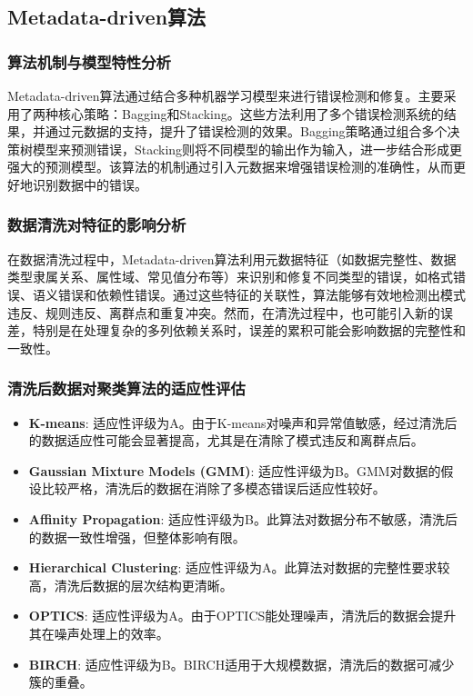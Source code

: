 \documentclass{ctexart} %
\begin{document}
\subsection{Metadata-driven算法}

\subsubsection{算法机制与模型特性分析}

Metadata-driven算法通过结合多种机器学习模型来进行错误检测和修复。主要采用了两种核心策略：Bagging和Stacking。这些方法利用了多个错误检测系统的结果，并通过元数据的支持，提升了错误检测的效果。Bagging策略通过组合多个决策树模型来预测错误，Stacking则将不同模型的输出作为输入，进一步结合形成更强大的预测模型。该算法的机制通过引入元数据来增强错误检测的准确性，从而更好地识别数据中的错误。

\subsubsection{数据清洗对特征的影响分析}

在数据清洗过程中，Metadata-driven算法利用元数据特征（如数据完整性、数据类型隶属关系、属性域、常见值分布等）来识别和修复不同类型的错误，如格式错误、语义错误和依赖性错误。通过这些特征的关联性，算法能够有效地检测出模式违反、规则违反、离群点和重复冲突。然而，在清洗过程中，也可能引入新的误差，特别是在处理复杂的多列依赖关系时，误差的累积可能会影响数据的完整性和一致性。

\subsubsection{清洗后数据对聚类算法的适应性评估}
\begin{itemize}
    \item \textbf{K-means}: 适应性评级为A。由于K-means对噪声和异常值敏感，经过清洗后的数据适应性可能会显著提高，尤其是在清除了模式违反和离群点后。
    \item \textbf{Gaussian Mixture Models (GMM)}: 适应性评级为B。GMM对数据的假设比较严格，清洗后的数据在消除了多模态错误后适应性较好。
    \item \textbf{Affinity Propagation}: 适应性评级为B。此算法对数据分布不敏感，清洗后的数据一致性增强，但整体影响有限。
    \item \textbf{Hierarchical Clustering}: 适应性评级为A。此算法对数据的完整性要求较高，清洗后数据的层次结构更清晰。
    \item \textbf{OPTICS}: 适应性评级为A。由于OPTICS能处理噪声，清洗后的数据会提升其在噪声处理上的效率。
    \item \textbf{BIRCH}: 适应性评级为B。BIRCH适用于大规模数据，清洗后的数据可减少簇的重叠。
\end{itemize}
\end{document}
